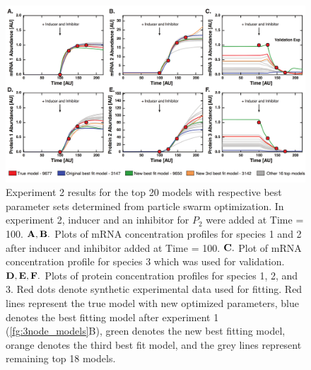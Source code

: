 \documentclass[12pt]{article}
\begin{document}
\begin{figure}\centering
\includegraphics[width=1.0\textwidth]{./figs_chp3/Fig3_Top20_Exp2_2.pdf}
\caption{Experiment 2 results for the top 20 models with respective best parameter sets determined from particle swarm optimization. In experiment 2, inducer and an inhibitor for $P_{2}$ were added at Time = 100. $\bf{A, B.}$ Plots of mRNA concentration profiles for species 1 and 2 after inducer and inhibitor added at Time = 100. $\bf{C.}$ Plot of mRNA concentration profile for species 3 which was used for validation. $\bf{D, E, F.}$ Plots of protein concentration profiles for species 1, 2, and 3. Red dots denote synthetic experimental data used for fitting. Red lines represent the true model with new optimized parameters, blue denotes the best fitting model after experiment 1 (\ref{fg:3node_models}B), green denotes the new best fitting model, orange denotes the third best fit model, and the grey lines represent remaining top 18 models.}
\label{fg:Top20Models_Exp2}
\end{figure}

\clearpage
\end{document}
